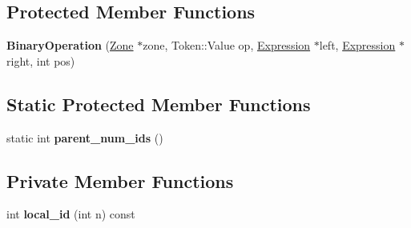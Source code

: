 \subsection*{Protected Member Functions}
\begin{DoxyCompactItemize}
\item 
{\bfseries Binary\+Operation} (\hyperlink{classv8_1_1internal_1_1_zone}{Zone} $\ast$zone, Token\+::\+Value op, \hyperlink{classv8_1_1internal_1_1_expression}{Expression} $\ast$left, \hyperlink{classv8_1_1internal_1_1_expression}{Expression} $\ast$right, int pos)\hypertarget{classv8_1_1internal_1_1_binary_operation_aaa6649863ff43cc6fa2140b43f485667}{}\label{classv8_1_1internal_1_1_binary_operation_aaa6649863ff43cc6fa2140b43f485667}

\end{DoxyCompactItemize}
\subsection*{Static Protected Member Functions}
\begin{DoxyCompactItemize}
\item 
static int {\bfseries parent\+\_\+num\+\_\+ids} ()\hypertarget{classv8_1_1internal_1_1_binary_operation_a33acb831134b6fb0a2026fc583d45f49}{}\label{classv8_1_1internal_1_1_binary_operation_a33acb831134b6fb0a2026fc583d45f49}

\end{DoxyCompactItemize}
\subsection*{Private Member Functions}
\begin{DoxyCompactItemize}
\item 
int {\bfseries local\+\_\+id} (int n) const \hypertarget{classv8_1_1internal_1_1_binary_operation_a5373f12d714095cc2024f89b4de3e1b8}{}\label{classv8_1_1internal_1_1_binary_operation_a5373f12d714095cc2024f89b4de3e1b8}

\end{DoxyCompactItemize}
